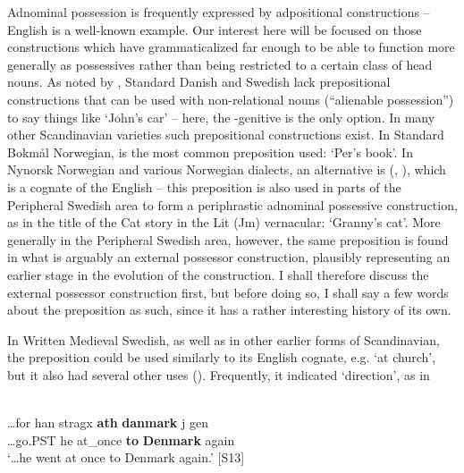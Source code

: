 Adnominal possession is frequently expressed by adpositional constructions – English is a well-known example. Our interest here will be focused on those constructions which have grammaticalized far enough to be able to function more generally as possessives rather than being restricted to a certain class of head nouns. As noted by \citet[43]{Delsing2003a}, Standard Danish and Swedish lack prepositional constructions that can be used with non-relational nouns (“alienable possession”) to say things like ‘John’s car’ – here, the -genitive is the only option. In many other Scandinavian varieties such prepositional constructions exist. In Standard Bokmål Norwegian,  is the most common preposition used:  ‘Per’s book’. In Nynorsk Norwegian and various Norwegian dialects, an alternative is (\citet[263]{FaarlundEtAl1997}, \citet[43]{Delsing2003a}), which is a cognate of the English  – this preposition is also used in parts of the Peripheral Swedish area to form a periphrastic adnominal possessive construction, as in the title of the Cat story in the Lit (Jm) vernacular: ‘Granny’s cat’. More generally in the Peripheral Swedish area, however, the same preposition is found in what is arguably an external possessor construction, plausibly representing an earlier stage in the evolution of the construction. I shall therefore discuss the external possessor construction first, but before doing so, I shall say a few words about the preposition as such, since it has a rather interesting history of its own. 

In Written Medieval Swedish, as well as in other earlier forms of Scandinavian, the preposition  could be used similarly to its English cognate, e.g.  ‘at church’, but it also had several other uses (\citet{Söderwall1884}). Frequently, it indicated ‘direction’, as in

\ea\label{}
\\
\gll …for  han  stragx  \textbf{ath} \textbf{danmark} j gen\\
…go.PST  he  at\_once  \textbf{to} \textbf{Denmark} again\\
\glt ‘…he went at once to Denmark again.’ [S13]
\z

